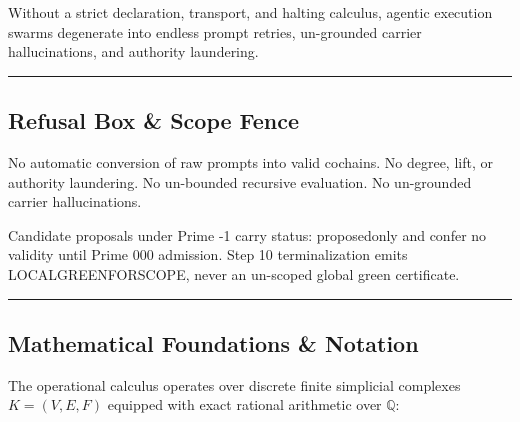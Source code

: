 \documentclass[
  11pt,
]{article}
\newenvironment{Shaded}{}{}
\newcommand{\NormalTok}[1]{#1}
\renewcommand{\_}{\origunderscore\allowbreak}
\begin{document}
Without a strict declaration, transport, and halting calculus, agentic
execution swarms degenerate into endless prompt retries, un-grounded
carrier hallucinations, and authority laundering.

\begin{center}\rule{0.5\linewidth}{0.5pt}\end{center}

\subsection{Refusal Box \& Scope Fence}\label{refusal-box-scope-fence}

\begin{Shaded}
\begin{Highlighting}[]
\NormalTok{No automatic conversion of raw prompts into valid cochains.}
\NormalTok{No degree, lift, or authority laundering.}
\NormalTok{No un{-}bounded recursive evaluation.}
\NormalTok{No un{-}grounded carrier hallucinations.}

\NormalTok{Candidate proposals under Prime {-}1 carry status: proposed\_only}
\NormalTok{and confer no validity until Prime 000 admission.}
\NormalTok{Step 10 terminalization emits LOCAL\_GREEN\_FOR\_SCOPE,}
\NormalTok{never an un{-}scoped global green certificate.}
\end{Highlighting}
\end{Shaded}

\begin{center}\rule{0.5\linewidth}{0.5pt}\end{center}

\subsection{Mathematical Foundations \&
Notation}\label{mathematical-foundations-notation}

The operational calculus operates over discrete finite simplicial
complexes \(K = (V, E, F)\) equipped with exact rational arithmetic over
\(\mathbb{Q}\):
\end{document}
